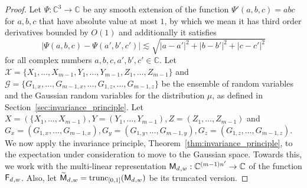 \documentclass[10pt,a4paper]{amsart}
\newcommand\card[1]{\left| {#1} \right|}
\newcommand{\V}[1]{{#1}}
\begin{document}
\begin{proof}
   
   	Let $\Psi\colon \mathbb{C}^3\to\mathbb{C}$ be any smooth extension of the function $\Psi'(a,b,c) = abc$ for $a,b,c$
	that have absolute value at most $1$, by which we mean it has third order derivatives bounded by $O(1)$ and  additionally it satisfies
    $$\card{\Psi(a, b, c) - \Psi(a',b',c')} \lesssim \sqrt{\card{a-a'}^2+\card{b-b'}^2+\card{c-c'}^2}$$
    for all complex numbers $a,b,c,a',b',c'\in \mathbb{C}$. Let $\mathbf{\mathcal{X}} = \{X_{1},\ldots,X_{m-1}, Y_{1}, \ldots, Y_{m-1}, Z_{1},\ldots, Z_{m-1}\}$ and $\mathbf{\mathcal{G}} = \{G_{1,x},\ldots,G_{m-1, x},\ldots, G_{1,z},\ldots,G_{m-1, z}\}$ be the ensemble of random variables and the Gaussian random variables for the distribution $\mu$, as defined in Section~\ref{sec:invariance_principle}. Let $X = (\{X_{1},\ldots,X_{m-1}), Y = (Y_{1}, \ldots, Y_{m-1}), Z=  (Z_{1},\ldots, Z_{m-1})$ and ${G}_x = (G_{1,x},\ldots,G_{m-1, x}),  {G}_y = (G_{1,y},\ldots,G_{m-1, y}), {G}_z=(G_{1,z},\ldots,G_{m-1, z})$. We now apply the invariance principle, Theorem~\ref{thm:invariance_principle}, to the expectation under consideration to move to the Gaussian space. Towards this, we work with the multi-linear representation $\multilinfcoarsedecoupled_{, \V w}: \mathbb{C}^{(m-1)n'}\rightarrow \mathbb{C}$ of the function $\fcoarsedecoupled_{,\V w}$. Also, let $\truncmultilinfcoarsedecoupled_{, \V w} = \mathrm{trunc}_{[0,1]}(\multilinfcoarsedecoupled_{, \V w})$ be its truncated version.


\end{proof}
\end{document}
